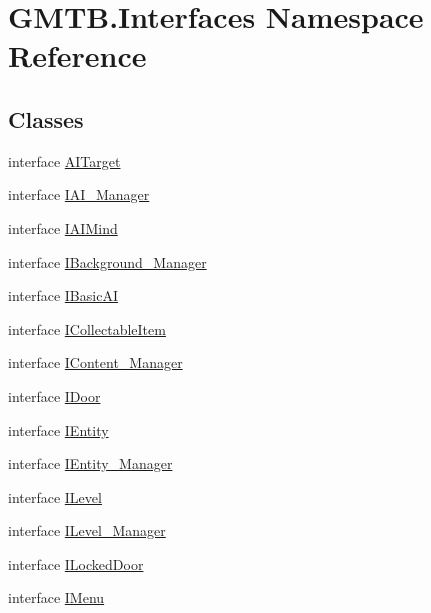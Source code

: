 \hypertarget{namespace_g_m_t_b_1_1_interfaces}{}\section{G\+M\+T\+B.\+Interfaces Namespace Reference}
\label{namespace_g_m_t_b_1_1_interfaces}
\subsection*{Classes}
\begin{DoxyCompactItemize}
\item 
interface \mbox{\hyperlink{interface_g_m_t_b_1_1_interfaces_1_1_a_i_target}{A\+I\+Target}}
\item 
interface \mbox{\hyperlink{interface_g_m_t_b_1_1_interfaces_1_1_i_a_i___manager}{I\+A\+I\+\_\+\+Manager}}
\item 
interface \mbox{\hyperlink{interface_g_m_t_b_1_1_interfaces_1_1_i_a_i_mind}{I\+A\+I\+Mind}}
\item 
interface \mbox{\hyperlink{interface_g_m_t_b_1_1_interfaces_1_1_i_background___manager}{I\+Background\+\_\+\+Manager}}
\item 
interface \mbox{\hyperlink{interface_g_m_t_b_1_1_interfaces_1_1_i_basic_a_i}{I\+Basic\+AI}}
\item 
interface \mbox{\hyperlink{interface_g_m_t_b_1_1_interfaces_1_1_i_collectable_item}{I\+Collectable\+Item}}
\item 
interface \mbox{\hyperlink{interface_g_m_t_b_1_1_interfaces_1_1_i_content___manager}{I\+Content\+\_\+\+Manager}}
\item 
interface \mbox{\hyperlink{interface_g_m_t_b_1_1_interfaces_1_1_i_door}{I\+Door}}
\item 
interface \mbox{\hyperlink{interface_g_m_t_b_1_1_interfaces_1_1_i_entity}{I\+Entity}}
\item 
interface \mbox{\hyperlink{interface_g_m_t_b_1_1_interfaces_1_1_i_entity___manager}{I\+Entity\+\_\+\+Manager}}
\item 
interface \mbox{\hyperlink{interface_g_m_t_b_1_1_interfaces_1_1_i_level}{I\+Level}}
\item 
interface \mbox{\hyperlink{interface_g_m_t_b_1_1_interfaces_1_1_i_level___manager}{I\+Level\+\_\+\+Manager}}
\item 
interface \mbox{\hyperlink{interface_g_m_t_b_1_1_interfaces_1_1_i_locked_door}{I\+Locked\+Door}}
\item 
interface \mbox{\hyperlink{interface_g_m_t_b_1_1_interfaces_1_1_i_menu}{I\+Menu}}

\end{DoxyCompactItemize}
